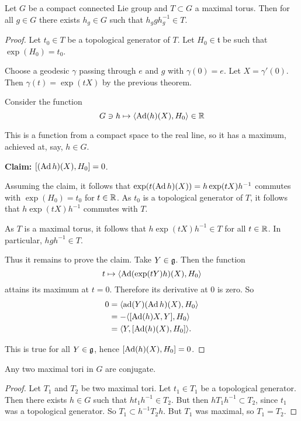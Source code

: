 \documentclass[11pt, english]{article}
\begin{document}
\begin{thm}[Cartan]
Let $G$ be a compact connected Lie group and $T \subset G$ a maximal torus. Then for all $g \in G$ there exists $h_g \in G$ such that $h_g g h_g^{-1} \in T$.
\end{thm}
\begin{proof}
Let $t_0 \in T$ be a topological generator of $T$. Let $H_0 \in \mathfrak t$ be such that $\exp(H_0)=t_0$. 

Choose a geodesic $\gamma$ passing through $e$ and $g$ with $\gamma(0)=e$. Let $X=\gamma'(0)$. Then $\gamma(t) = \exp(tX)$ by the previous theorem.

Consider the function 
$$
G \ni h \mapsto \langle \operatorname{Ad}(h)(X),H_0 \rangle \in \mathbb{R}
$$

This is a function from a compact space to the real line, so it has a maximum, achieved at, say, $h \in G$.

\textbf{Claim: } $[(\operatorname{Ad} h)(X), H_0] = 0$. 

Assuming the claim, it follows that $\exp(t(\operatorname{Ad} h)(X))=h \exp(tX)h^{-1}$ commutes with $\exp(H_0)=t_0$ for $t \in \mathbb{R}$. As $t_0$ is a topological generator of $T$, it follows that $h \exp(tX)h^{-1}$ commutes with $T$. 

As $T$ is a maximal torus, it follows that $h \exp(tX) h^{-1} \in T$ for all $t \in \mathbb{R}$. In particular, $hgh^{-1} \in T$.

Thus it remains to prove the claim. Take $Y \in \mathfrak g$. Then the function 
$$
t \mapsto \langle \operatorname{Ad}(\exp(tY)h)(X), H_0 \rangle 
$$
attains its maximum at $t=0$. Therefore its derivative at $0$ is zero. So
\begin{align*}
0 &= \langle \operatorname{ad}(Y)( \operatorname{Ad} h)(X), H_0 \rangle \\
&= - \langle [\operatorname{Ad}(h)X,Y], H_0 \rangle \\
&= \langle Y, [\operatorname{Ad}(h)(X),H_0] \rangle.
\end{align*}

This is true for all $Y \in \mathfrak g$, hence $[\operatorname{Ad}(h)(X),H_0]  = 0$. 
\end{proof}


\begin{corr}
Any two maximal tori in $G$ are conjugate.
\end{corr}
\begin{proof}
Let $T_1$ and $T_2$ be two maximal tori. Let $t_1 \in T_1$ be a topological generator. Then there exists $h \in G$ such that $ht_1 h^{-1} \in T_2$. But then $hT_1 h^{-1} \subset T_2$, since $t_1$ was a topological generator.  So $T_1 \subset h^{-1} T_2 h$. But $T_1$ was maximal, so $T_1=T_2$.
\end{proof}
\end{document}
